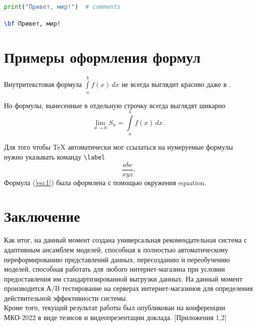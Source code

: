 \documentclass[14pt]{mmcs_article}
\begin{document}
\begin{lstlisting}[language=Python, caption={Python, пример кода}, label=stud-lst:2]
print("Привет, мир!")  # comments
\end{lstlisting}

\begin{lstlisting}[language=TeX, caption=\LaTeX, label=stud-lst:3]
% параметр language в наших листингах только для себя
\bf Привет, мир!
\end{lstlisting}



\newpage
\section{Примеры оформления формул}

Внутритекстовая формула
$ \int\limits_a^b f(x)\,dx$ не всегда выглядит красиво даже в \LaTeXe.

Но формулы, вынесенные в отдельную строчку всегда выглядят шикарно
\[
  \lim_{d\to 0} S_n =
  \int\limits_a^b f(x)\,dx.
\]

Для того чтобы {\TeX} автоматически мог ссылаться на нумеруемые формулы нужно указывать команду \verb"\label"
\begin{equation}\label{eq:1}
  \frac{abc}{xyz}.
\end{equation}
Формула (\ref{eq:1}) была оформлена с помощью окружения \textsf{equation}.

\newpage
{}
\section*{Заключение}

Как итог, на данный момент создана универсальная рекомендательная система с адаптивным ансамблем моделей, способная к полностью автоматическому переформированию представлений данных, пересозданию и переобучению моделей, способная работать для любого интернет-магазина при условии предоставления им стандартизированной выгрузки данных. На данный момент производится А/B тестирование на серверах интернет-магазинов для определения действительной эффективности системы. \\
Кроме того, текущий результат работы был опубликован на конференции МКО-2022 в виде тезисов и видеопрезентации доклада. [Приложения 1,2]



\newpage
\end{document}
